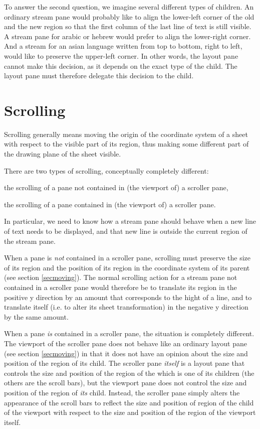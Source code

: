 To answer the second question, we imagine several different types of
children.  An ordinary stream pane would probably like to align the
lower-left corner of the old and the new region so that the first
column of the last line of text is still visible.  A stream pane for
arabic or hebrew would prefer to align the lower-right corner.  And a
stream for an asian language written from top to bottom, right to
left, would like to preserve the upper-left corner.  In other words,
the layout pane cannot make this decision, as it depends on the exact
type of the child.  The layout pane must therefore delegate this
decision to the child.  

\section{Scrolling}

Scrolling generally means moving the origin of the coordinate system
of a sheet with respect to the visible part of its region, thus making
some different part of the drawing plane of the sheet visible. 

There are two types of scrolling, conceptually completely different:

\begin{itemize0}
\item the scrolling of a pane not contained in (the viewport of) a
scroller pane, 
\item the scrolling of a pane contained in (the viewport of) a
scroller pane. 
\end{itemize0}

In particular, we need to know how a stream pane should behave when a
new line of text needs to be displayed, and that new line is outside
the current region of the stream pane.

When a pane is \emph{not} contained in a scroller pane, scrolling must
preserve the size of its region and the position of its region in the
coordinate system of its parent (see section \ref{secmoving}).  The
normal scrolling action for a stream pane not contained in a scroller
pane would therefore be to translate its region in the positive y
direction by an amount that corresponds to the hight of a line, and to
translate itself (i.e. to alter its sheet transformation) in the
negative y direction by the same amount.

When a pane \emph{is} contained in a scroller pane, the situation is
completely different.  The viewport of the scroller pane does not
behave like an ordinary layout pane (see section \ref{secmoving}) in
that it does not have an opinion about the size and position of the
region of its child.  The scroller pane \emph{itself} is a layout pane
that controls the size and position of the region of the
 which is one of its children (the others are the
scroll bars), but the viewport pane does not control the size and
position of the region of \emph{its} child.  Instead, the scroller
pane simply alters the appearance of the scroll bars to reflect the
size and position of region of the child of the viewport with respect
to the size and position of the region of the viewport itself.

